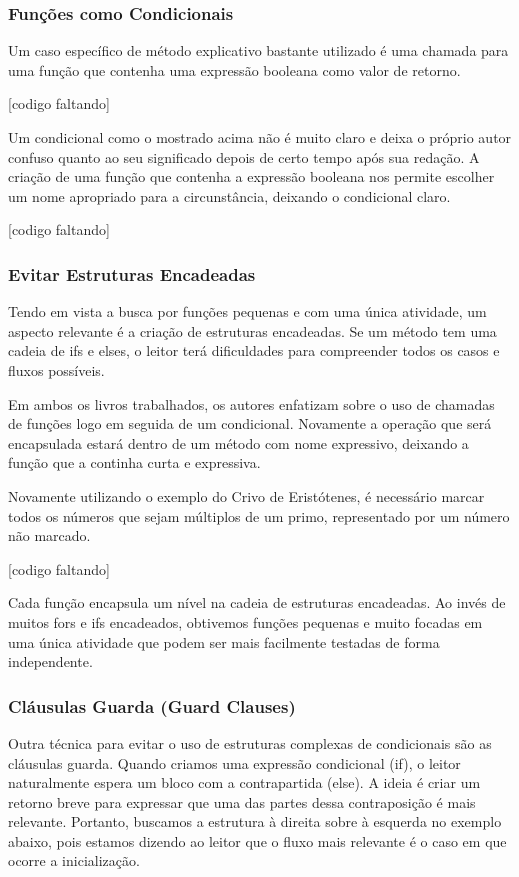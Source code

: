 \subsubsection{Funções como Condicionais}
	Um caso específico de método explicativo bastante utilizado é uma chamada para uma função que contenha uma expressão booleana como valor de retorno.
	
[codigo faltando]

	Um condicional como o mostrado acima não é muito claro e deixa o próprio autor confuso quanto ao seu significado depois de certo tempo após sua redação. A criação de uma função que contenha a expressão booleana nos permite escolher um nome apropriado para a circunstância, deixando o condicional claro.

[codigo faltando]

\subsubsection{Evitar Estruturas Encadeadas}
	Tendo em vista a busca por funções pequenas e com uma única atividade, um aspecto relevante é a criação de estruturas encadeadas. Se um método tem uma cadeia de ifs e elses, o leitor terá dificuldades para compreender todos os casos e fluxos possíveis.
	
	Em ambos os livros trabalhados, os autores enfatizam sobre o uso de chamadas de funções logo em seguida de um condicional. Novamente a operação que será encapsulada estará dentro de um método com nome expressivo, deixando a função que a continha curta e expressiva.
	
	Novamente utilizando o exemplo do Crivo de Eristótenes, é necessário marcar todos os números que sejam múltiplos de um primo, representado por um número não marcado.

[codigo faltando]

	Cada função encapsula um nível na cadeia de estruturas encadeadas. Ao invés de muitos fors e ifs encadeados, obtivemos funções pequenas e muito focadas em uma única atividade que podem ser mais facilmente testadas de forma independente.

\subsubsection{Cláusulas Guarda (Guard Clauses)}
	Outra técnica para evitar o uso de estruturas complexas de condicionais são as cláusulas guarda. Quando criamos uma expressão condicional (if), o leitor naturalmente espera um bloco com a contrapartida (else). A ideia é criar um retorno breve para expressar que uma das partes dessa contraposição é mais relevante. Portanto, buscamos a estrutura à direita sobre à esquerda no exemplo abaixo, pois estamos dizendo ao leitor que o fluxo mais relevante é o caso em que ocorre a inicialização.
	
